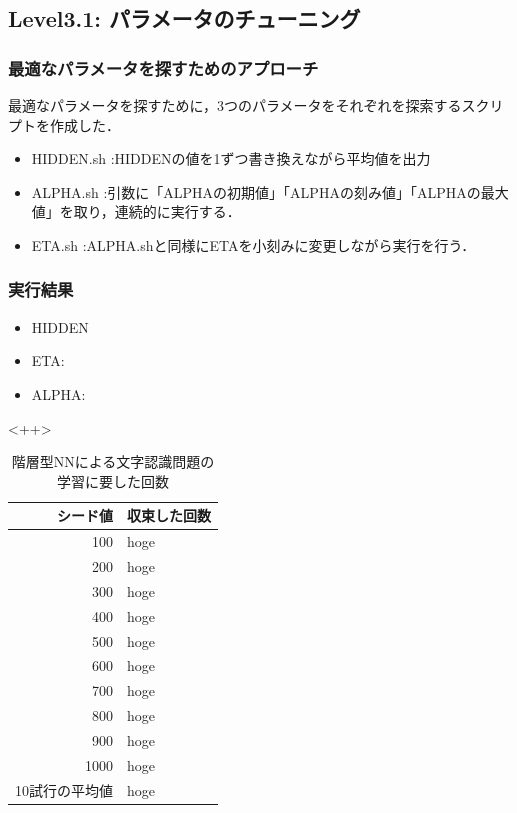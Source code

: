 \subsection{Level3.1: パラメータのチューニング}
\subsubsection{最適なパラメータを探すためのアプローチ}
最適なパラメータを探すために，3つのパラメータをそれぞれを探索するスクリプトを作成した．
\begin{itemize}
	\item HIDDEN.sh :HIDDENの値を1ずつ書き換えながら平均値を出力
	\item ALPHA.sh  :引数に「ALPHAの初期値」「ALPHAの刻み値」「ALPHAの最大値」を取り，連続的に実行する．
	\item ETA.sh    :ALPHA.shと同様にETAを小刻みに変更しながら実行を行う．
\end{itemize}

\subsubsection{実行結果}
\begin{itemize}
	\item HIDDEN
	\item ETA:
	\item ALPHA:
\end{itemize}<++>

\begin{table}[htb]
 \begin{center}
  \caption{階層型NNによる文字認識問題の学習に要した回数}
  \label{table:level3}
  \begin{tabular}[htb]{r|l} \hline
   シード値 & 収束した回数 \\ \hline \hline
   100 & hoge \\ \hline
   200 & hoge \\ \hline
   300 & hoge \\ \hline
   400 & hoge \\ \hline
   500 & hoge \\ \hline
   600 & hoge \\ \hline
   700 & hoge \\ \hline
   800 & hoge \\ \hline
   900 & hoge \\ \hline
   1000 & hoge \\ \hline \hline
   10試行の平均値 & hoge \\ \hline
  \end{tabular}
 \end{center}
\end{table}

